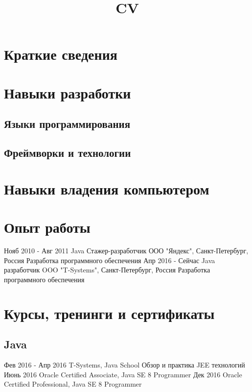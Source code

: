 \documentclass[11pt,a4paper,russian]{moderncv}
\title{CV}
\begin{document}
\maketitle

\section{Краткие сведения}
  
\section{Навыки разработки}

\subsection{Языки программирования}

\subsection{Фреймворки и технологии}

\section{Навыки владения компьютером}
  
\section{Опыт работы}
\cventry
    {Нояб 2010 - Авг 2011}
    {Java Стажер-разработчик}
    {ООО "Яндекс", Санкт-Петербург, Россия}{}{}
    {Разработка программного обеспечения}
\cventry
    {Апр 2016 - Сейчас}
    {Java разработчик}
    {OOO "T-Systems", Санкт-Петербург, Россия}{}{}
    {Разработка программного обеспечения}
  
\section{Курсы, тренинги и сертификаты}
\subsection{Java}
\cvline
    {Фев 2016 - Апр 2016}
    {T-Systems, Java School \newline
    Обзор и практика JEE технологий} 
\cvline
    {Июнь 2016}
    {Oracle Certified Associate, Java SE 8 Programmer}
\cvline
    {Дек 2016}
    {Oracle Certified Professional, Java SE 8 Programmer}
  
\end{document}
